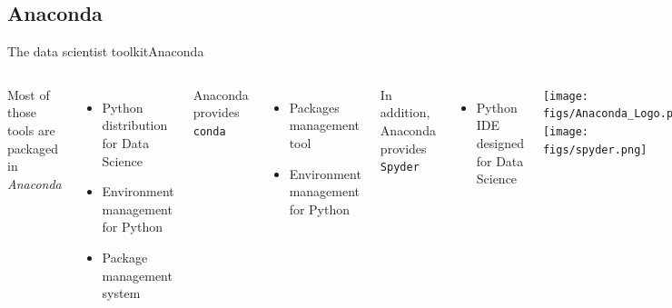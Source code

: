 \documentclass[10pt,compress]{beamer} %
\begin{document}
\subsection{Anaconda}
\begin{frame}{The data scientist toolkit}{Anaconda}
    \begin{columns}
   Most of those tools are packaged in \textit{Anaconda}
   \begin{itemize}
   		\item Python distribution for Data Science
		\item Environment management for Python
		\item Package management system
	\end{itemize}

	Anaconda provides \texttt{conda}
	\begin{itemize}
		\item Packages management tool
		\item Environment management for Python
	\end{itemize}

	In addition, Anaconda provides \texttt{Spyder}
	\begin{itemize}
		\item Python IDE designed for Data Science
	\end{itemize}

		\texttt{[image: figs/Anaconda\_Logo.png]} \\\bigskip
		\texttt{[image: figs/spyder.png]}	
	\end{columns}
\end{frame}
\end{document}

